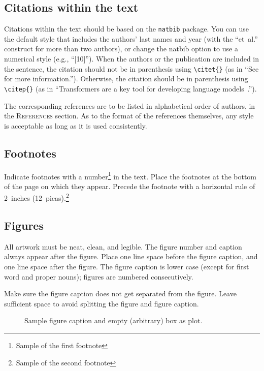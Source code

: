 \documentclass{article} %
\begin{document}
\subsection{Citations within the text}

Citations within the text should be based on the \texttt{natbib} package. You can use the default style that includes the authors' last names and year (with the ``et~al.'' construct
for more than two authors), or change the natbib option to use a numerical style (e.g., ``[10]''). When the authors or the publication are included in the sentence, the citation should not be in parenthesis using \verb|\citet{}| (as
in ``See \citet{Vaswani+2017} for more information.''). Otherwise, the citation
should be in parenthesis using \verb|\citep{}| (as in ``Transformers are a key tool
for developing language models~\citep{Vaswani+2017}.'').

The corresponding references are to be listed in alphabetical order of
authors, in the \textsc{References} section. As to the format of the
references themselves, any style is acceptable as long as it is used
consistently.

\subsection{Footnotes}

Indicate footnotes with a number\footnote{Sample of the first footnote} in the
text. Place the footnotes at the bottom of the page on which they appear.
Precede the footnote with a horizontal rule of 2~inches
(12~picas).\footnote{Sample of the second footnote}

\subsection{Figures}

All artwork must be neat, clean, and legible.
The figure number and caption always appear after the figure. Place one line space before the figure caption, and one line space after the figure. The figure caption is lower case (except for
first word and proper nouns); figures are numbered consecutively.

Make sure the figure caption does not get separated from the figure.
Leave sufficient space to avoid splitting the figure and figure caption.

\begin{figure}[h]
\begin{center}
\fbox{\rule[-.5cm]{0cm}{4cm} \rule[-.5cm]{4cm}{0cm}}
\end{center}
\caption{Sample figure caption and empty (arbitrary) box as plot.}
\end{figure}
\end{document}
